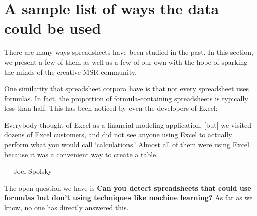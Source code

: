 \documentclass[conference]{IEEEtran}
\newcommand{\xlscount}{249,376}
\begin{document}
% 
% 


\section{A sample list of ways the data could be used}
\label{how_to_use_fuse}
There are many ways spreadsheets have been studied in the past.  
In this section, we present a few of them as well as a few of our own with the hope of sparking the minds of the creative MSR community.

One similarity that spreadsheet corpora have is that not every spreadsheet uses formulas.  
In fact, the proportion of formula-containing spreadsheets is typically less than half.
This has been noticed by even the developers of Excel:
\begin{displayquote}
Everybody thought of Excel as a financial modeling application, [but] we visited dozens of Excel customers, and did not see anyone using Excel to actually perform what you would call `calculations.' Almost all of them were using Excel because it was a convenient way to create a table.

 --- Joel Spolsky~\cite{JoelOnSoftware}
\end{displayquote}
The open question we have is \textbf{Can you detect spreadsheets that could use formulas but don't using techniques like machine learning?}
As far as we know, no one has directly answered this.
\end{document}
